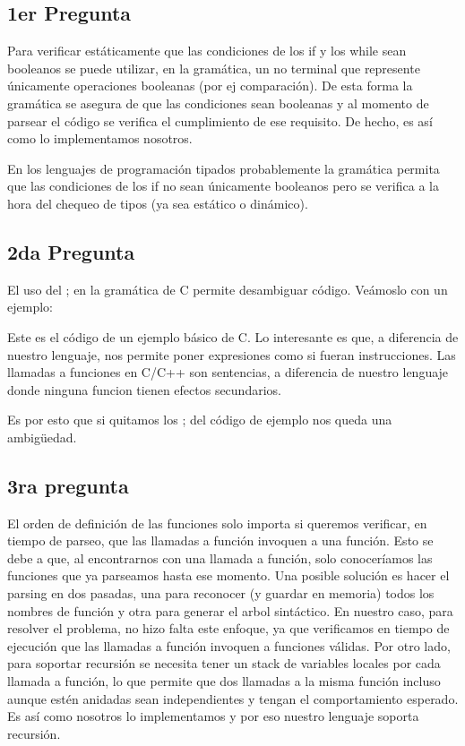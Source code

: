 \subsection{1er Pregunta}

Para verificar estáticamente que las condiciones de los if y los while sean booleanos se puede utilizar, en la gramática, un no terminal que represente únicamente operaciones booleanas (por ej comparación). De esta forma la gramática se asegura de que las condiciones sean booleanas y al momento de parsear el código se verifica el cumplimiento de ese requisito. De hecho, es así como lo implementamos nosotros.

En los lenguajes de programación tipados probablemente la gramática permita que las condiciones de los if no sean únicamente booleanos pero se verifica a la hora del chequeo de tipos (ya sea estático o dinámico).

\subsection{2da Pregunta} El uso del ; en la gramática de C permite desambiguar código. Veámoslo con un ejemplo:



Este es el código de un ejemplo básico de C. Lo interesante es que, a diferencia de nuestro lenguaje, nos permite poner expresiones como si fueran instrucciones. Las llamadas a funciones en C/C++ son sentencias, a diferencia de nuestro lenguaje donde ninguna funcion tienen efectos secundarios. 

Es por esto que si quitamos los ; del código de ejemplo nos queda una ambigüedad.

\subsection{3ra pregunta}
El orden de definición de las funciones solo importa si queremos verificar, en tiempo de parseo, que las llamadas a función invoquen a una función. Esto se debe a que, al encontrarnos con una llamada a función, solo conoceríamos las funciones que ya parseamos hasta ese momento. Una posible solución es hacer el parsing en dos pasadas, una para reconocer (y guardar en memoria) todos los nombres de función y otra para generar el arbol sintáctico. En nuestro caso, para resolver el problema, no hizo falta este enfoque, ya que verificamos en tiempo de ejecución que las llamadas a función invoquen a funciones válidas.
Por otro lado, para soportar recursión se necesita tener un stack de variables locales por cada llamada a función, lo que permite que dos llamadas a la misma función incluso aunque estén anidadas sean independientes y tengan el comportamiento esperado. Es así como nosotros lo implementamos y por eso nuestro lenguaje soporta recursión.
